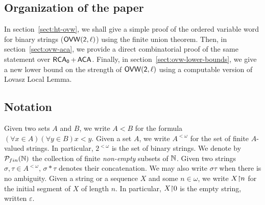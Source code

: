 \subsection{Organization of the paper}
In section~\ref{sect:ht-ovw}, we shall give a simple proof of the ordered variable word for binary strings ($\sf{OVW}(2,\ell)$) using the finite union theorem. Then, in section~\ref{sect:ovw-aca}, we provide a direct combinatorial proof of the same statement over $\operatorname{\sf{RCA}_0} + \operatorname{\sf{ACA}}$.
Finally, in section~\ref{sect:ovw-lower-bounds}, we give a new lower bound on the strength of $\sf{OVW}(2,\ell)$ using a computable version of Lovasz Local Lemma.

\subsection{Notation}

Given two sets $A$ and $B$, we write $A < B$ for the formula $(\forall x \in A)(\forall y \in B) x < y$.
Given a set $A$, we write $A^{<\omega}$ for the set of finite $A$-valued strings. In particular, $2^{<\omega}$ is the set of binary strings. We denote by $\mathcal{P}_{fin}(\mathbb{N})$ the collection of finite \emph{non-empty} subsets of $\mathbb{N}$. Given two strings $\sigma, \tau \in A^{<\omega}$, $\sigma*\tau$ denotes their concatenation. We may also write $\sigma\tau$ when there is no ambiguity. Given a string or a sequence $X$ and some $n \in \omega$, we write $X {\upharpoonright} n$ for the initial segment of $X$ of length $n$. In particular, $X {\upharpoonright} 0$ is the empty string, written $\varepsilon$.
